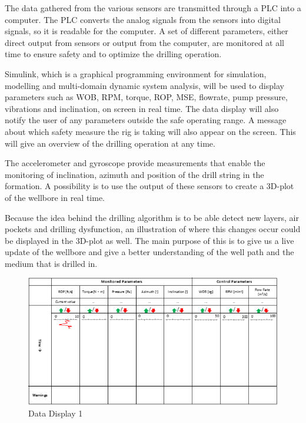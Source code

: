 The data gathered from the various sensors are transmitted through a PLC into a computer. The PLC converts the analog signals from the sensors into digital signals, so it is readable for the computer. A set of different parameters, either direct output from sensors or output from the computer, are monitored at all time to ensure safety and to optimize the drilling operation. 


Simulink, which is a graphical programming environment for simulation, modelling and multi-domain dynamic system analysis, will be used to display parameters such as WOB, RPM, torque, ROP, MSE, flowrate, pump pressure, vibrations and inclination, on screen in real time. The data display will also notify the user of any parameters outside the safe operating range. A message about which safety measure the rig is taking will also appear on the screen. This will give an overview of the drilling operation at any time.

The accelerometer and gyroscope provide measurements that enable the monitoring of inclination, azimuth and position of the drill string in the formation. A possibility is to use the output of these sensors to create a 3D-plot of the wellbore in real time. 

Because the idea behind the drilling algorithm is to be able detect new layers, air pockets and drilling dysfunction, an illustration of where this changes occur could be displayed in the 3D-plot as well. The main purpose of this is to give us a live update of the wellbore and give a better understanding of the well path and the medium that is drilled in. 

\begin{figure} [H]
\centering
\includegraphics[width=1.0\textwidth]{figures/datadisplay.png}
\caption{Data Display 1}
\label{fig:datadisplay}
\end{figure}


